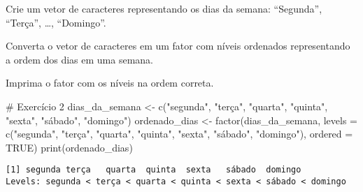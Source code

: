 \documentclass[
  letterpaper,
  DIV=11,
  numbers=noendperiod]{scrartcl}
\newenvironment{Shaded}{\begin{snugshade}}{\end{snugshade}}
\newcommand{\AttributeTok}[1]{\textcolor[rgb]{0.40,0.45,0.13}{#1}}
\newcommand{\CommentTok}[1]{\textcolor[rgb]{0.37,0.37,0.37}{#1}}
\newcommand{\ConstantTok}[1]{\textcolor[rgb]{0.56,0.35,0.01}{#1}}
\newcommand{\FunctionTok}[1]{\textcolor[rgb]{0.28,0.35,0.67}{#1}}
\newcommand{\NormalTok}[1]{\textcolor[rgb]{0.00,0.23,0.31}{#1}}
\newcommand{\OtherTok}[1]{\textcolor[rgb]{0.00,0.23,0.31}{#1}}
\newcommand{\StringTok}[1]{\textcolor[rgb]{0.13,0.47,0.30}{#1}}
\begin{document}
Crie um vetor de caracteres representando os dias da semana:
``Segunda'', ``Terça'', \ldots, ``Domingo''.

Converta o vetor de caracteres em um fator com níveis ordenados
representando a ordem dos dias em uma semana.

Imprima o fator com os níveis na ordem correta.

\begin{Shaded}
\begin{Highlighting}[]
\CommentTok{\# Exercício 2  }
\NormalTok{dias\_da\_semana }\OtherTok{\textless{}{-}} \FunctionTok{c}\NormalTok{(}\StringTok{"segunda"}\NormalTok{, }\StringTok{"terça"}\NormalTok{, }\StringTok{"quarta"}\NormalTok{, }\StringTok{"quinta"}\NormalTok{, }\StringTok{"sexta"}\NormalTok{, }\StringTok{"sábado"}\NormalTok{, }\StringTok{"domingo"}\NormalTok{)  }
\NormalTok{ordenado\_dias }\OtherTok{\textless{}{-}} \FunctionTok{factor}\NormalTok{(dias\_da\_semana, }\AttributeTok{levels =} \FunctionTok{c}\NormalTok{(}\StringTok{"segunda"}\NormalTok{, }\StringTok{"terça"}\NormalTok{, }\StringTok{"quarta"}\NormalTok{, }\StringTok{"quinta"}\NormalTok{, }\StringTok{"sexta"}\NormalTok{, }\StringTok{"sábado"}\NormalTok{, }\StringTok{"domingo"}\NormalTok{), }\AttributeTok{ordered =} \ConstantTok{TRUE}\NormalTok{)  }
\FunctionTok{print}\NormalTok{(ordenado\_dias)}
\end{Highlighting}
\end{Shaded}

\begin{verbatim}
[1] segunda terça   quarta  quinta  sexta   sábado  domingo
Levels: segunda < terça < quarta < quinta < sexta < sábado < domingo
\end{verbatim}
\end{document}
